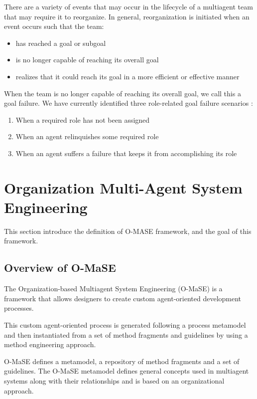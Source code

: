 There are a variety of events that may occur in the lifecycle of a multiagent team that may require it to reorganize. In
general, reorganization is initiated when an event occurs such that the team\cite{omacs1}:
\begin{itemize}
\newcommand{\localtextbulletone}{\textcolor{gray}{\raisebox{.45ex}{\rule{.6ex}{.6ex}}}}
\renewcommand{\labelitemi}{\localtextbulletone}
	\item has reached a goal or subgoal
	\item is no longer capable of reaching its overall goal
	\item realizes that it could reach its goal in a more efficient or effective manner
\end{itemize}
 

When the team is no longer capable of reaching its overall goal, 
we call this a goal failure. We have currently identified three role-related goal failure
scenarios \cite{omacs1}:

\begin{enumerate}
	\item When a required role has not been assigned
	\item When an agent relinquishes some required role
	\item When an agent suffers a failure that keeps it from accomplishing its role 
\end{enumerate}
\pagebreak

\section{Organization Multi-Agent System Engineering}
This section introduce the definition of O-MASE framework, and the goal of this framework.   
\subsection{Overview of O-MaSE}
The Organization-based Multiagent System Engineering (O-MaSE) is a framework that 
 allows designers to create custom agent-oriented development processes. 
 
This custom agent-oriented process is generated following a process metamodel 
and then instantiated from a set of method fragments and guidelines 
by using a method engineering approach. 

O-MaSE defines a metamodel, a repository of method fragments and a set of guidelines. 
The O-MaSE metamodel defines general concepts used in multiagent systems
along with their relationships and is based on an organizational approach\cite{omacs6}.
 
